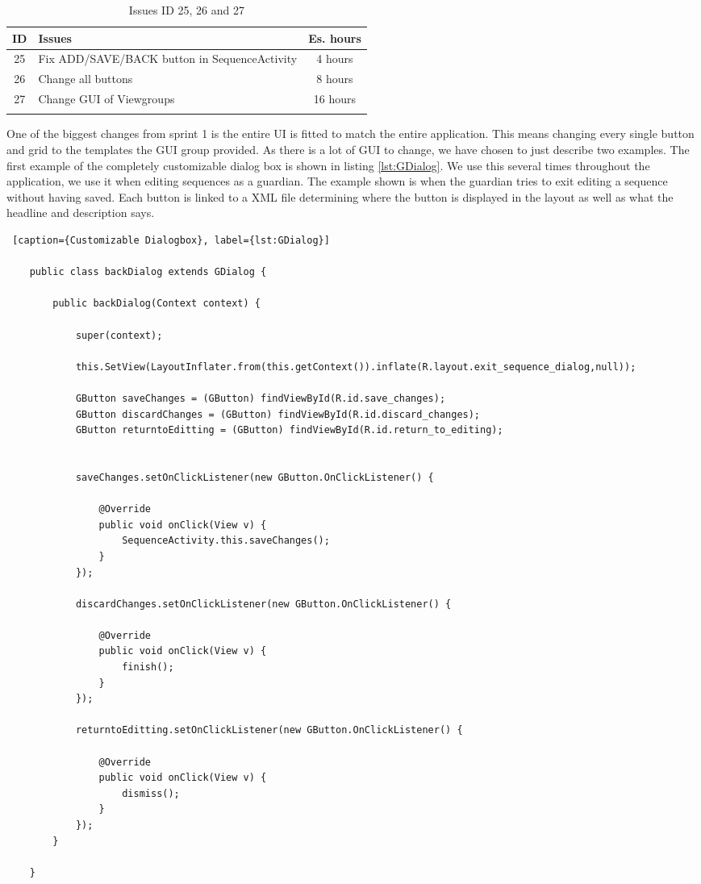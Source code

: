 
\begin{longtable} { | c | p{12cm} | c | } 
\hline
	ID 	&	Issues	&		 Es. hours \\\hline
	25	& 	Fix ADD/SAVE/BACK button in SequenceActivity	&	4 hours	\\\hline
	26	& 	Change all buttons	&	8 hours	\\\hline
	27	& 	Change GUI of Viewgroups	&	16 hours	\\\hline
\caption{Issues ID 25, 26 and 27}
\label{tab:spr2_GUIchange}
\end{longtable}

One of the biggest changes from sprint 1 is the entire UI is fitted to match the entire application. This means changing every single button and grid to the templates the GUI group provided. As there is a lot of GUI to change, we have chosen to just describe two examples. The first example of the completely customizable dialog box is shown in listing \ref{lst:GDialog}. We use this several times throughout the application, we use it when editing sequences as a guardian. The example shown is when the guardian tries to exit editing a sequence without having saved. Each button is linked to a XML file determining where the button is displayed in the layout as well as what the headline and description says.

\begin{lstlisting} [caption={Customizable Dialogbox}, label={lst:GDialog}]

    public class backDialog extends GDialog {

        public backDialog(Context context) {

            super(context);

            this.SetView(LayoutInflater.from(this.getContext()).inflate(R.layout.exit_sequence_dialog,null));

            GButton saveChanges = (GButton) findViewById(R.id.save_changes);
            GButton discardChanges = (GButton) findViewById(R.id.discard_changes);
            GButton returntoEditting = (GButton) findViewById(R.id.return_to_editing);


            saveChanges.setOnClickListener(new GButton.OnClickListener() {

                @Override
                public void onClick(View v) {
                    SequenceActivity.this.saveChanges();
                }
            });

            discardChanges.setOnClickListener(new GButton.OnClickListener() {

                @Override
                public void onClick(View v) {
                    finish();
                }
            });

            returntoEditting.setOnClickListener(new GButton.OnClickListener() {

                @Override
                public void onClick(View v) {
                    dismiss();
                }
            });
        }

    }
\end{lstlisting}


